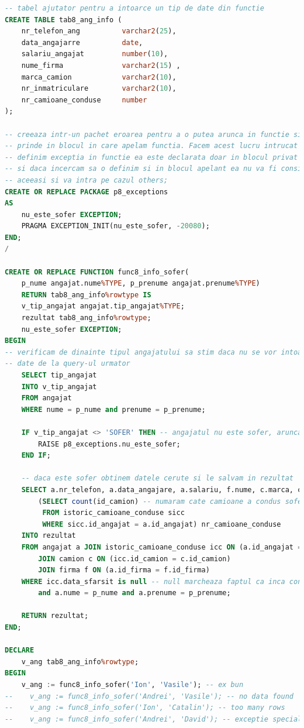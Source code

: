 \documentclass[12pt, a4paper]{article}
\begin{document}
\begin{lstlisting}[language=SQL]
-- tabel ajutator pentru a intoarce un tip de date din functie
CREATE TABLE tab8_ang_info (
    nr_telefon_ang          varchar2(25),
    data_angajarre          date,
    salariu_angajat         number(10),
    nume_firma              varchar2(15) ,
    marca_camion            varchar2(10),
    nr_inmatriculare        varchar2(10),
    nr_camioane_conduse     number
);

-- creeaza intr-un pachet eroarea pentru a o putea arunca in functie si a o
-- prinde in blocul in care apelam functia. Facem acest lucru intrucat daca
-- definim exceptia in functie ea este declarata doar in blocul privat al functiei
-- si daca incercam sa o definim si in blocul apelant ea nu va fi considerata
-- aceeasi si va intra pe cazul others;
CREATE OR REPLACE PACKAGE p8_exceptions
AS
    nu_este_sofer EXCEPTION;
    PRAGMA EXCEPTION_INIT(nu_este_sofer, -20080);
END;
/

CREATE OR REPLACE FUNCTION func8_info_sofer(
    p_nume angajat.nume%TYPE, p_prenume angajat.prenume%TYPE)
    RETURN tab8_ang_info%rowtype IS
    v_tip_angajat angajat.tip_angajat%TYPE;
    rezultat tab8_ang_info%rowtype;
    nu_este_sofer EXCEPTION;
BEGIN
-- verificam de dinainte tipul angajatului sa stim daca nu se vor intoarce
-- date de la query-ul urmator
    SELECT tip_angajat
    INTO v_tip_angajat
    FROM angajat
    WHERE nume = p_nume and prenume = p_prenume;    

    IF v_tip_angajat <> 'SOFER' THEN -- angajatul nu este sofer, aruncam exceptie
        RAISE p8_exceptions.nu_este_sofer;
    END IF;
    
    -- daca este sofer obtinem datele cerute si le salvam in rezultat
    SELECT a.nr_telefon, a.data_angajare, a.salariu, f.nume, c.marca, c.nr_inmatriculare,
        (SELECT count(id_camion) -- numaram cate camioane a condus soferul folosind o subcerere
         FROM istoric_camioane_conduse sicc
         WHERE sicc.id_angajat = a.id_angajat) nr_camioane_conduse
    INTO rezultat
    FROM angajat a JOIN istoric_camioane_conduse icc ON (a.id_angajat = icc.id_angajat)
        JOIN camion c ON (icc.id_camion = c.id_camion)
        JOIN firma f ON (a.id_firma = f.id_firma)
    WHERE icc.data_sfarsit is null -- null marcheaza faptul ca inca conduce camionul
        and a.nume = p_nume and a.prenume = p_prenume;

    RETURN rezultat;
END;

DECLARE
    v_ang tab8_ang_info%rowtype;
BEGIN 
    v_ang := func8_info_sofer('Ion', 'Vasile'); -- ex bun
--    v_ang := func8_info_sofer('Andrei', 'Vasile'); -- no data found
--    v_ang := func8_info_sofer('Ion', 'Catalin'); -- too many rows
--    v_ang := func8_info_sofer('Andrei', 'David'); -- exceptie speciala nu este sofer


\end{lstlisting}
\end{document}
